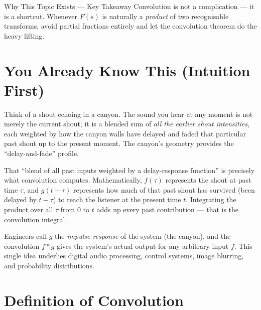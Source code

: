 \documentclass[12pt,a4paper]{article}
\begin{document}
\begin{learnbox}{Why This Topic Exists --- Key Takeaway}
Convolution is not a complication --- it is a shortcut. Whenever $F(s)$ is naturally a
\emph{product} of two recognisable transforms, avoid partial fractions entirely and let
the convolution theorem do the heavy lifting.
\end{learnbox}

\section{You Already Know This (Intuition First)}

Think of a shout echoing in a canyon. The sound you hear at any moment is not merely the
current shout; it is a blended sum of \emph{all the earlier shout intensities}, each weighted
by how the canyon walls have delayed and faded that particular past shout up to the present
moment. The canyon's geometry provides the ``delay-and-fade'' profile.

That ``blend of all past inputs weighted by a delay-response function'' is precisely what
convolution computes. Mathematically, $f(\tau)$ represents the shout at past time $\tau$,
and $g(t-\tau)$ represents how much of that past shout has survived (been delayed by
$t-\tau$) to reach the listener at the present time $t$. Integrating the product over all
$\tau$ from $0$ to $t$ adds up every past contribution --- that is the convolution integral.

Engineers call $g$ the \emph{impulse response} of the system (the canyon), and the
convolution $f{*}g$ gives the system's actual output for any arbitrary input $f$. This
single idea underlies digital audio processing, control systems, image blurring, and
probability distributions.

\section{Definition of Convolution}
\end{document}
